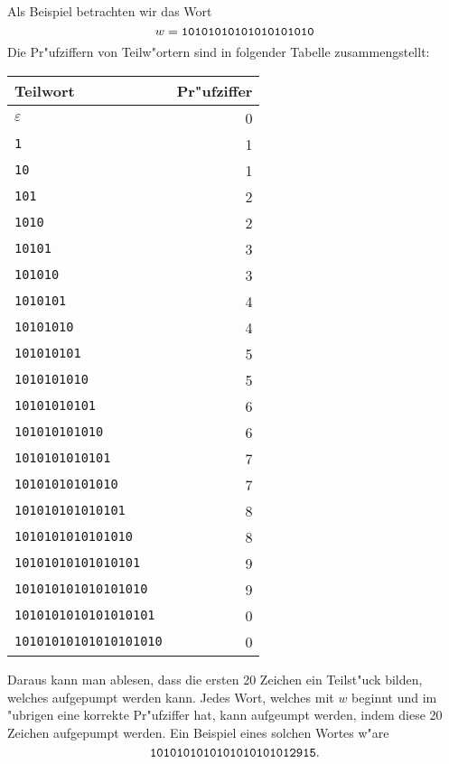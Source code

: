 \begin{loesung}
Als Beispiel betrachten wir das Wort
\[
w=\text{\tt 10101010101010101010}
\]
Die Pr"ufziffern von Teilw"ortern sind in folgender Tabelle
zusammengstellt:
\begin{center}
\begin{tabular}{|l|r|}
\hline
Teilwort&Pr"ufziffer\\
\hline
$\varepsilon$             &0\\
{\tt 1}                   &1\\
{\tt 10}                  &1\\
{\tt 101}                 &2\\
{\tt 1010}                &2\\
{\tt 10101}               &3\\
{\tt 101010}              &3\\
{\tt 1010101}             &4\\
{\tt 10101010}            &4\\
{\tt 101010101}           &5\\
{\tt 1010101010}          &5\\
{\tt 10101010101}         &6\\
{\tt 101010101010}        &6\\
{\tt 1010101010101}       &7\\
{\tt 10101010101010}      &7\\
{\tt 101010101010101}     &8\\
{\tt 1010101010101010}    &8\\
{\tt 10101010101010101}   &9\\
{\tt 101010101010101010}  &9\\
{\tt 1010101010101010101} &0\\
{\tt 10101010101010101010}&0\\
\hline
\end{tabular}
\end{center}
Daraus kann man ablesen, dass die ersten 20 Zeichen ein Teilst"uck
bilden, welches aufgepumpt werden kann. Jedes Wort, welches mit
$w$ beginnt und im "ubrigen eine korrekte Pr"ufziffer hat, kann
aufgeumpt werden, indem diese 20 Zeichen aufgepumpt werden.
Ein Beispiel eines solchen Wortes w"are
\[
\text{\tt 1010101010101010101012915}.
\]
\end{loesung}
